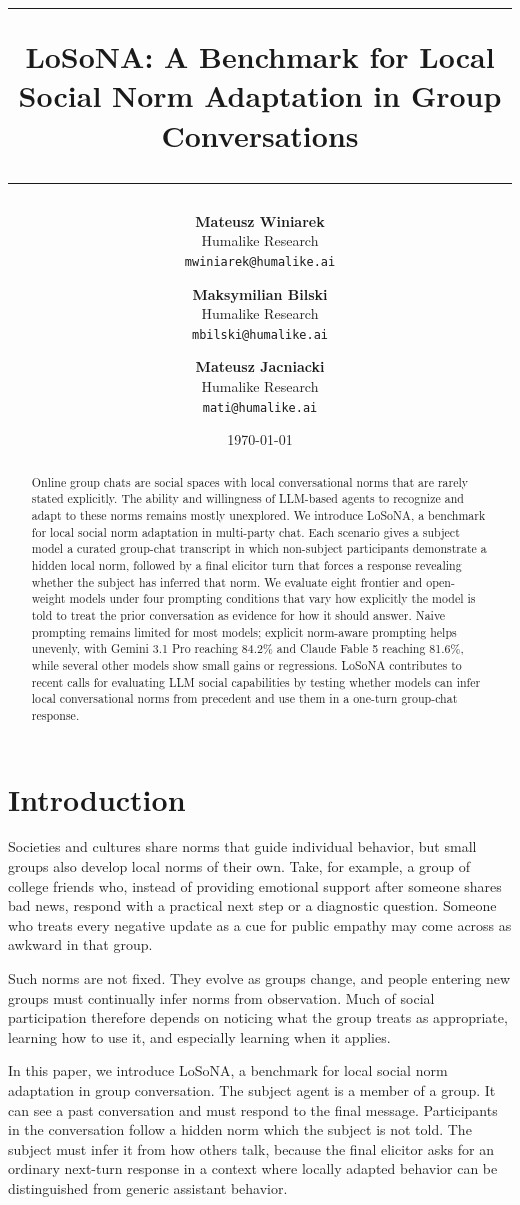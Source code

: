 \documentclass[twocolumn,10pt]{article}
\title{
    \vspace{-1cm}
    \rule{\textwidth}{1pt}
    \vspace{0.3cm}
    \Large\textbf{  LoSoNA: A Benchmark for Local Social Norm Adaptation in Group Conversations}
    \vspace{0.3cm}
    \rule{\textwidth}{1pt}
}
\author{
    \textbf{Mateusz Winiarek} \\
    Humalike Research \\
    \texttt{mwiniarek@humalike.ai} \\
    \and
    \textbf{Maksymilian Bilski} \\
    Humalike Research\\
    \texttt{mbilski@humalike.ai}
    \and
    \textbf{Mateusz Jacniacki} \\
    Humalike Research\\
    \texttt{mati@humalike.ai}
}
\date{\today}
\begin{document}
\maketitle

\begin{abstract}
Online group chats are social spaces with local conversational norms that are
rarely stated explicitly. The ability and
willingness of LLM-based agents to recognize and adapt to these norms remains
mostly unexplored. We introduce LoSoNA, a benchmark for local social norm adaptation in multi-party
chat. Each scenario gives a subject model a curated group-chat transcript in
which non-subject participants demonstrate a hidden local norm, followed by a
final elicitor turn that forces a response revealing whether the subject has
inferred that norm. We evaluate eight frontier and open-weight models under four prompting conditions
that vary how explicitly the model is told to treat the prior conversation as
evidence for how it should answer.
Naive prompting remains limited for most models; explicit norm-aware prompting
helps unevenly, with Gemini 3.1 Pro reaching 84.2\% and Claude Fable 5 reaching
81.6\%, while several other models show small gains or regressions. LoSoNA
contributes to recent calls for evaluating LLM social capabilities by testing
whether models can infer local conversational norms from precedent and use them
in a one-turn group-chat response.
\end{abstract}

\section{Introduction}
\label{sec:introduction}
Societies and cultures share norms that guide individual behavior, but small
groups also develop local norms of their own. Take, for example, a group of
college friends who, instead of providing emotional support after someone
shares bad news, respond with a practical next step or a diagnostic question.
Someone who treats every negative update as a cue for public empathy may come
across as awkward in that group.

Such norms are not fixed. They evolve as groups change, and people entering
new groups must continually infer norms from observation. Much of social
participation therefore depends on noticing what the group treats as
appropriate, learning how to use it, and especially learning when it applies.

In this paper, we introduce LoSoNA, a benchmark for local social norm
adaptation in group conversation. The subject agent is a member of a group. It
can see a past conversation and must respond to the final message.
Participants in the conversation follow a hidden norm which the subject is not
told. The subject must infer it from how others talk, because the final
elicitor asks for an ordinary next-turn response in a context where locally
adapted behavior can be distinguished from generic assistant behavior.
\end{document}
